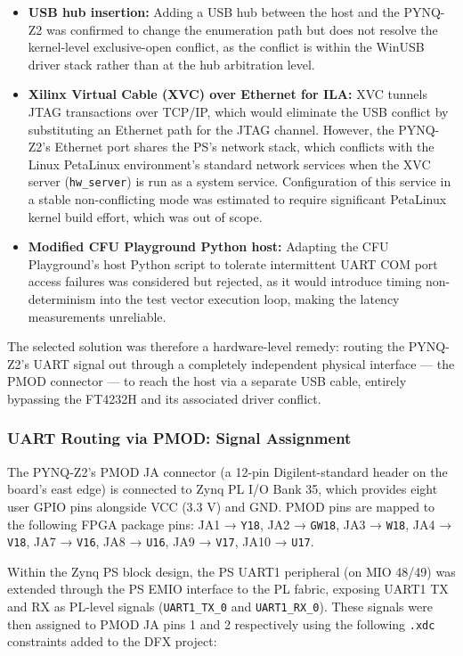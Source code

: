 \begin{itemize}
  \item \textbf{USB hub insertion:} Adding a USB hub between the host and the PYNQ-Z2 was confirmed to change the enumeration path but does not resolve the kernel-level exclusive-open conflict, as the conflict is within the WinUSB driver stack rather than at the hub arbitration level.
  \item \textbf{Xilinx Virtual Cable (XVC) over Ethernet for ILA:} XVC tunnels JTAG transactions over TCP/IP, which would eliminate the USB conflict by substituting an Ethernet path for the JTAG channel. However, the PYNQ-Z2's Ethernet port shares the PS's network stack, which conflicts with the Linux PetaLinux environment's standard network services when the XVC server (\texttt{hw\_server}) is run as a system service. Configuration of this service in a stable non-conflicting mode was estimated to require significant PetaLinux kernel build effort, which was out of scope.
  \item \textbf{Modified CFU Playground Python host:} Adapting the CFU Playground's host Python script to tolerate intermittent UART COM port access failures was considered but rejected, as it would introduce timing non-determinism into the test vector execution loop, making the latency measurements unreliable.
\end{itemize}
The selected solution was therefore a hardware-level remedy: routing the PYNQ-Z2's UART signal out through a completely independent physical interface — the PMOD connector — to reach the host via a separate USB cable, entirely bypassing the FT4232H and its associated driver conflict.

\subsubsection{UART Routing via PMOD: Signal Assignment}

The PYNQ-Z2's PMOD JA connector (a 12-pin Digilent-standard header on the board's east edge) is connected to Zynq PL I/O Bank 35, which provides eight user GPIO pins alongside VCC (3.3 V) and GND. PMOD pins are mapped to the following FPGA package pins: JA1 → \texttt{Y18}, JA2 → \texttt{GW18}, JA3 → \texttt{W18}, JA4 → \texttt{V18}, JA7 → \texttt{V16}, JA8 → \texttt{U16}, JA9 → \texttt{V17}, JA10 → \texttt{U17}.

Within the Zynq PS block design, the PS UART1 peripheral (on MIO 48/49) was extended through the PS EMIO interface to the PL fabric, exposing UART1 TX and RX as PL-level signals (\texttt{UART1\_TX\_0} and \texttt{UART1\_RX\_0}). These signals were then assigned to PMOD JA pins 1 and 2 respectively using the following \texttt{.xdc} constraints added to the DFX project:

